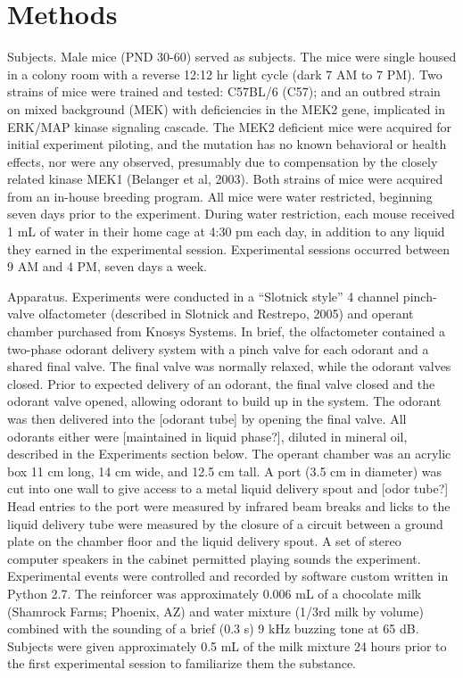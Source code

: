 \section{Methods}

Subjects.
Male mice (PND 30-60) served as subjects. The mice were single housed in a colony room with a reverse 12:12 hr light cycle (dark 7 AM to 7 PM). Two strains of mice were trained and tested: C57BL/6 (C57); and an outbred strain on mixed background (MEK) with deficiencies in the MEK2 gene, implicated in ERK/MAP kinase signaling cascade. The MEK2 deficient mice were acquired for initial experiment piloting, and the mutation has no known behavioral or health effects, nor were any observed, presumably due to compensation by the closely related kinase MEK1 (Belanger et al, 2003). Both strains of mice were acquired from an in-house breeding program. All mice were water restricted, beginning seven days prior to the experiment. During water restriction, each mouse received 1 mL of water in their home cage at 4:30 pm each day, in addition to any liquid they earned in the experimental session. Experimental sessions occurred between 9 AM and 4 PM, seven days a week.

Apparatus.
Experiments were conducted in a “Slotnick style” 4 channel pinch-valve olfactometer (described in Slotnick and Restrepo, 2005) and operant chamber purchased from Knosys Systems. In brief, the olfactometer contained a two-phase odorant delivery system with a pinch valve for each odorant and a shared final valve. The final valve was normally relaxed, while the odorant valves closed. Prior to expected delivery of an odorant, the final valve closed and the odorant valve opened, allowing odorant to build up in the system. The odorant was then delivered into the [odorant tube] by opening the final valve. All odorants either were [maintained in liquid phase?], diluted in mineral oil, described in the Experiments section below.
The operant chamber was an acrylic box 11 cm long, 14 cm wide, and 12.5 cm tall. A port (3.5 cm in diameter) was cut into one wall to give access to a metal liquid delivery spout and [odor tube?] Head entries to the port were measured by infrared beam breaks and licks to the liquid delivery tube were measured by the closure of a circuit between a ground plate on the chamber floor and the liquid delivery spout. A set of stereo computer speakers in the cabinet permitted playing sounds the experiment.  Experimental events were controlled and recorded by software custom written in Python 2.7.
The reinforcer was approximately 0.006 mL of a chocolate milk (Shamrock Farms; Phoenix, AZ) and water mixture (1/3rd milk by volume) combined with the sounding of a brief (0.3 s) 9 kHz buzzing tone at 65 dB. Subjects were given approximately 0.5 mL of the milk mixture 24 hours prior to the first experimental session to familiarize them the substance.  


